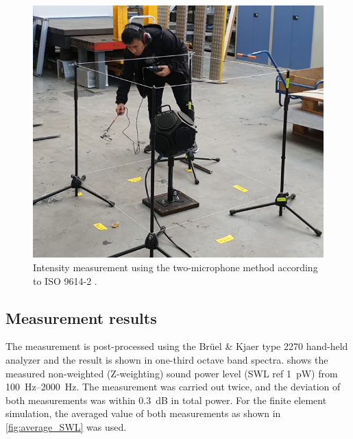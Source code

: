 \begin{figure}[H]
\begin{center}
\includegraphics[width=12cm]{fig/Sound_power_measurement_2.png}
\caption{Intensity measurement using the two-microphone method according to ISO 9614-2 \cite{din19969614}.}
\label{fig:scanningmethod}
\end{center}
\end{figure}

\subsection*{Measurement results}

The measurement is post-processed using the Brüel \& Kjaer type 2270 hand-held analyzer and the result is shown in one-third octave band spectra.  shows the measured non-weighted (Z-weighting) sound power level (SWL ref \SI{1}{\pico\watt}) from \SIrange{100}{2000}{\hertz}. The measurement was carried out twice, and the deviation of both measurements was within \SI{0.3}{\dB} in total power. For the finite element simulation, the averaged value of both measurements as shown in \cref{fig:average_SWL} was used.

